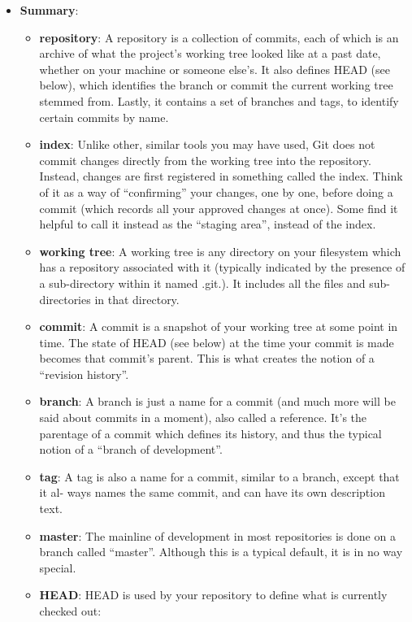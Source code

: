 \documentclass{report}
\begin{document}
\begin{itemize}
        \item \textbf{Summary}: 
            \begin{itemize}
                \item \textbf{repository}: A repository is a collection of commits, each of which is an archive of what the project's working tree looked like at a past date, whether on your machine or someone else's. It also defines HEAD (see below), which identifies the branch or commit the current working tree stemmed from. Lastly, it contains a set of branches and tags, to identify certain commits by name.
                \item \textbf{index}: Unlike other, similar tools you may have used, Git does not commit changes directly from the working tree into the repository. Instead, changes are first registered in something called the index. Think of it as a way of “confirming” your changes, one by one, before doing a commit (which records all your approved changes at once). Some find it helpful to call it instead as the “staging area”, instead of the index.
                \item \textbf{working tree}: A working tree is any directory on your filesystem which has a repository associated with it (typically indicated by the presence of a sub-directory within it named .git.). It includes all the files and sub-directories in that directory.
                \item \textbf{commit}: A commit is a snapshot of your working tree at some point in time. The state of HEAD (see below) at the time your commit is made becomes that commit’s parent. This is what creates the notion of a “revision history”.
                \item \textbf{branch}: A branch is just a name for a commit (and much more will be said about commits in a moment), also called a reference. It’s the parentage of a commit which defines its history, and thus the typical notion of a “branch of development”.
                \item \textbf{tag}: A tag is also a name for a commit, similar to a branch, except that it al- ways names the same commit, and can have its own description text.
                \item \textbf{master}: The mainline of development in most repositories is done on a branch called “master”. Although this is a typical default, it is in no way special.
                \item \textbf{HEAD}: HEAD is used by your repository to define what is currently checked out:

\end{itemize}
\end{itemize}
\end{document}
